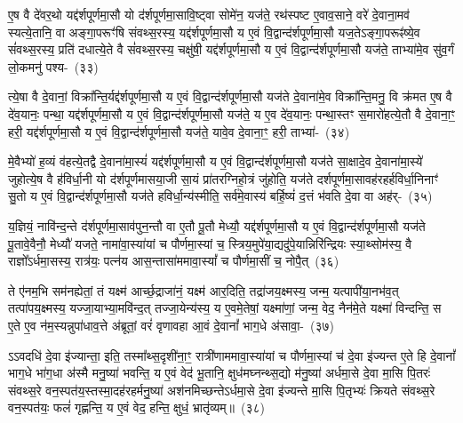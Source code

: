 {\anuvakamend[{च॒न्द्रमा॒ द्वे दे॑वलो॒कमे॒व यद्य॒ज्ञं प॑ल्पूलयेयुः॒ षट्च॑}]}%

ए॒ष वै दे॑वर॒थो यद्द॑र्\mbox{}श\-पूर्ण\-मा॒सौ यो द॑र्\mbox{}शपूर्णमा॒सावि॒ष्ट्वा सोमे॑न॒ यज॑ते॒ रथ॑स्पष्ट ए॒वाव॒साने॒ वरे॑ दे॒वाना॒मव॑ स्यत्ये॒तानि॒ वा अङ्गा॒परूꣳ॑षि संवथ्स॒रस्य॒ यद्द॑र्\mbox{}श\-पूर्ण\-मा॒सौ य ए॒वं वि॒द्वान्द॑र्\mbox{}शपूर्णमा॒सौ यज॒ते\-ऽङ्गा॒परूꣴ॑ष्ये॒व सं॑वथ्स॒रस्य॒ प्रति॑ दधात्ये॒ते वै सं॑वथ्स॒रस्य॒ चक्षु॑षी॒ यद्द॑र्\mbox{}श\-पूर्ण\-मा॒सौ य ए॒वं वि॒द्वान्द॑र्\mbox{}शपूर्णमा॒सौ यज॑ते॒ ताभ्या॑मे॒व सु॑व॒र्गं लो॒कमनु॑ \mbox{पश्य-~(३३)}

त्ये॒षा वै दे॒वानां॒ विक्रा᳚न्ति॒र्यद्द॑र्\mbox{}श\-पूर्ण\-मा॒सौ य ए॒वं वि॒द्वान्द॑र्\mbox{}शपूर्णमा॒सौ यज॑ते दे॒वाना॑मे॒व विक्रा᳚न्ति॒मनु॒ वि क्र॑मत ए॒ष वै दे॑व॒यानः॒ पन्था॒ यद्द॑र्\mbox{}श\-पूर्ण\-मा॒सौ य ए॒वं वि॒द्वान्द॑र्\mbox{}शपूर्णमा॒सौ यज॑ते॒ य ए॒व दे॑व॒यानः॒ पन्था॒स्तꣳ स॒मारो॑हत्ये॒तौ वै दे॒वाना॒ꣳ॒ हरी॒ यद्द॑र्\mbox{}श\-पूर्ण\-मा॒सौ य ए॒वं वि॒द्वान्द॑र्\mbox{}शपूर्णमा॒सौ यज॑ते॒ यावे॒व दे॒वाना॒ꣳ॒ हरी॒ ताभ्या॑-~(३४)

मे॒वैभ्यो॑ ह॒व्यं व॑हत्ये॒तद्वै दे॒वाना॑मा॒स्यं॑ यद्द॑र्\mbox{}श\-पूर्ण\-मा॒सौ य ए॒वं वि॒द्वान्द॑र्\mbox{}शपूर्णमा॒सौ यज॑ते सा॒क्षादे॒व दे॒वाना॑मा॒स्ये॑ जुहोत्ये॒ष वै ह॑विर्धा॒नी यो द॑र्\mbox{}शपूर्णमासया॒जी सा॒यं प्रा॑तरग्निहो॒त्रं जु॑होति॒ यज॑ते दर्\mbox{}श\-पूर्ण\-मा॒सावह॑रहर्\mbox{}हविर्धा॒निनाꣳ॑ सु॒तो य ए॒वं वि॒द्वान्द॑र्\mbox{}शपूर्णमा॒सौ यज॑ते हविर्धा॒न्य॑स्मीति॒ सर्व॑मे॒वास्य॑ बर्\mbox{}हि॒ष्यं॑ द॒त्तं भ॑वति दे॒वा वा अह॑र्-~(३५)

य॒ज्ञियं॒ नावि॑न्द॒न्ते द॑र्\mbox{}शपूर्णमा॒साव॑पुन॒न्तौ वा ए॒तौ पू॒तौ मेध्यौ॒ यद्द॑र्\mbox{}श\-पूर्ण\-मा॒सौ य ए॒वं वि॒द्वान्द॑र्\mbox{}शपूर्णमा॒सौ यज॑ते पू॒तावे॒वैनौ॒ मेध्यौ॑ यजते॒ नामा॑वा॒स्या॑यां च पौर्णमा॒स्यां च॒ स्त्रिय॒मुपे॑या॒द्यदु॑पे॒यान्निरि॑न्द्रियः स्या॒थ्सोम॑स्य॒ वै राज्ञो᳚\-ऽर्धमा॒सस्य॒ रात्र॑यः॒ पत्न॑य आस॒न्तासा॑ममावा॒स्यां᳚ च पौर्णमा॒सीं च॒ नोपै॒त्~(३६)

ते ए॑नम॒भि सम॑नह्येतां॒ तं यक्ष्म॑ आर्च्छ॒द्राजा॑नं॒ यक्ष्म॑ आर॒दिति॒ तद्रा॑जय॒क्ष्मस्य॒ जन्म॒ यत्पापी॑या॒नभ॑व॒त् त\-त्पा॑पय॒क्ष्मस्य॒ यज्जा॒याभ्या॒मवि॑न्द॒त् तज्जा॒येन्य॑स्य॒ य ए॒वमे॒तेषां॒ यक्ष्मा॑णां॒ जन्म॒ वेद॒ नैन॑मे॒ते यक्ष्मा॑ विन्दन्ति॒ स ए॒ते ए॒व न॑म॒स्यन्नुपा॑धाव॒त्ते अ॑ब्रूतां॒ वरं॑ वृणावहा आ॒वं दे॒वानां᳚ भाग॒धे अ॑सावा॒-~(३७)

ऽऽवदधि॑ दे॒वा इ॑ज्यान्ता॒ इति॒ तस्मा᳚थ्स॒दृशी॑ना॒ꣳ॒ रात्री॑णाममावा॒स्या॑यां च पौर्णमा॒स्यां च॑ दे॒वा इ॑ज्यन्त ए॒ते हि दे॒वानां᳚ भाग॒धे भा॑ग॒धा अ॑स्मै मनु॒ष्या॑ भवन्ति॒ य ए॒वं वेद॑ भू॒तानि॒ क्षुध॑मघ्नन्थ्स॒द्यो म॑नु॒ष्या॑ अर्धमा॒से दे॒वा मा॒सि पि॒तरः॑ संवथ्स॒रे वन॒स्पत॑य॒स्तस्मा॒दह॑रहर्मनु॒ष्या॑ अश॑नमिच्छन्ते\-ऽर्धमा॒से दे॒वा इ॑ज्यन्ते मा॒सि पि॒तृभ्यः॑ क्रियते संवथ्स॒रे वन॒स्पत॑यः॒ फलं॑ गृह्णन्ति॒ य ए॒वं वेद॒ हन्ति॒ क्षुधं॒ भ्रातृ॑व्यम्॥~(३८)

